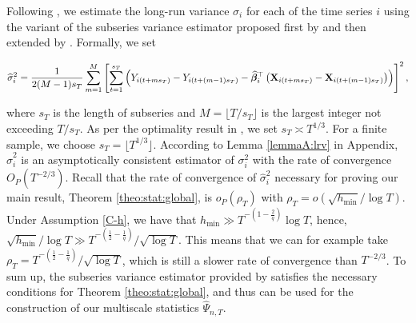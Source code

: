 \documentclass[a4paper,12pt]{article}
\makeatletter
\renewcommand{\eqref}[1]{\tagform@{\ref{#1}}}
\makeatother
\begin{document}
Following \cite{Kim2016}, we estimate the long-run variance $\sigma_i$ for each of the time \linebreak series $i$ using the variant of the subseries variance estimator proposed first by \cite{Carlstein1986} and then extended by \cite{WuZhao2007}. Formally, we set
\begin{small}
\begin{align}\label{eq:lrv}
\widehat{\sigma}_i^2 = \frac{1}{2(M-1)s_T}\sum_{m=1}^M \left[\sum_{t = 1}^{s_T} \left(Y_{i(t + ms_T)} - Y_{i(t + (m-1)s_T)} - \widehat{\bm{\beta}}_i^\top\left(\mathbf{X}_{i(t+ms_T)} - \mathbf{X}_{i(t+(m-1)s_T)}\right) \right)\right]^2,
\end{align}
\end{small}

where $s_T$ is the length of subseries and $M = \lfloor T/s_T\rfloor$ is the largest integer not exceeding $T/s_T$. As per the optimality result in \cite{Carlstein1986}, we set $s_T \asymp T^{1/3}$. For a finite sample, we choose $s_T = \lfloor T^{1/3}\rfloor$. According to  Lemma \ref{lemmaA:lrv} in Appendix, $\widehat{\sigma}_i^2$ is an asymptotically consistent estimator of $\sigma_i^2$ with the rate of convergence $O_P(T^{-2/3})$. Recall that the rate of convergence of $\widehat{\sigma}^2_i$ necessary for proving our main result, Theorem \ref{theo:stat:global}, is $o_P(\rho_T)$ with $\rho_T = o(\sqrt{h_{\min}}/\log T)$. Under Assumption \ref{C-h}, we have that $h_{\min} \gg T^{- \left(1 - \frac{2}{q}\right)}\log T$, hence, $\sqrt{h_{\min}}/\log T \gg T^{- \left(\frac{1}{2} - \frac{1}{q}\right)}/\sqrt{\log T}$. This means that we can for example take $\rho_T = T^{- \left(\frac{1}{2} - \frac{1}{q}\right)}/\sqrt{\log T}$, which is still a slower rate of convergence than $T^{-2/3}$. To sum up, the subseries variance estimator provided by \eqref{eq:lrv} satisfies the necessary conditions for Theorem \ref{theo:stat:global}, and thus can be used for the construction of our multiscale statistics $\widehat{\Psi}_{n, T}$.
\end{document}
